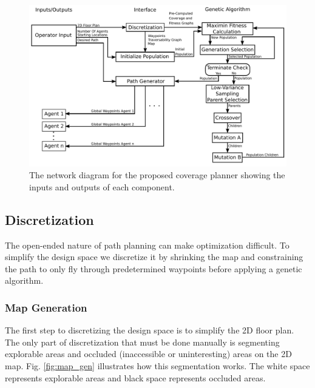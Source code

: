 \documentclass[letterpaper, 10 pt, conference]{ieeeconf}  %
\begin{document}
\begin{figure}
\centering
\includegraphics[width=0.8\linewidth]{coverage_planner_network.pdf}
\caption[The network diagram for the coverage path planner.]{The network diagram for the proposed coverage planner showing the inputs and outputs of each component.}
\label{fig:network}
\end{figure}

\subsection{Discretization}

The open-ended nature of path planning can make optimization difficult. To simplify the design space we discretize it by shrinking the map and constraining the path to only fly through predetermined waypoints before applying a genetic algorithm.

\subsubsection{Map Generation}

The first step to discretizing the design space is to simplify the 2D floor plan. The only part of discretization that must be done manually is segmenting explorable areas and occluded (inaccessible or uninteresting) areas on the 2D map. Fig. \ref{fig:map_gen} illustrates how this segmentation works. The white space represents explorable areas and black space represents occluded areas.
\end{document}
